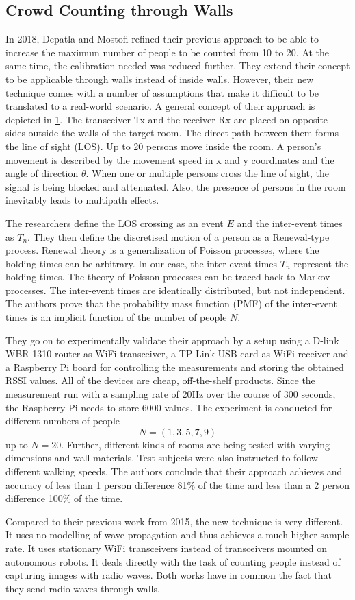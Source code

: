 \documentclass[conference]{IEEEtran}
\begin{document}
\subsection{Crowd Counting through Walls}
In 2018, Depatla and Mostofi \cite{DepatlaMostofi2018} refined their previous approach to be able to increase the maximum number of people to be counted from 10 to 20. At the same time, the calibration needed was reduced further. They extend their concept to be applicable through walls instead of inside walls. However, their new technique comes with a number of assumptions that make it difficult to be translated to a real-world scenario. A general concept of their approach is depicted in \ref{concept}. The transceiver Tx and the receiver Rx are placed on opposite sides outside the walls of the target room. The direct path between them forms the line of sight (LOS). Up to 20 persons move inside the room. A person's movement is described by the movement speed in x and y coordinates and the angle of direction $\theta$. When one or multiple persons cross the line of sight, the signal is being blocked and attenuated. Also, the presence of persons in the room inevitably leads to multipath effects.
\begin{figure}
\label{concept}
\end{figure}
The researchers define the LOS crossing as an event $E$ and the inter-event times as $T_n$. They then define the discretised motion of a person as a Renewal-type process. Renewal theory is a generalization of Poisson processes, where the holding times can be arbitrary. In our case, the inter-event times $T_n$ represent the holding times. The theory of Poisson processes can be traced back to Markov processes. The inter-event times are identically distributed, but not independent. The authors prove that the probability mass function (PMF) of the inter-event times is an implicit function of the number of people $N$.
\par
They go on to experimentally validate their approach by a setup using a D-link WBR-1310 router as WiFi transceiver, a TP-Link USB card as WiFi receiver and a Raspberry Pi board for controlling the measurements and storing the obtained RSSI values. All of the devices are cheap, off-the-shelf products. Since the measurement run with a sampling rate of 20Hz over the course of 300 seconds, the Raspberry Pi needs to store 6000 values. The experiment is conducted for different numbers of people $$N = (1, 3, 5, 7, 9)$$ up to $N=20$. Further, different kinds of rooms are being tested with varying dimensions and wall materials. Test subjects were also instructed to follow different walking speeds. The authors conclude that their approach achieves and accuracy of less than 1 person difference 81\% of the time and less than a 2 person difference 100\% of the time.
\par
Compared to their previous work from 2015, the new technique is very different. It uses no modelling of wave propagation and thus achieves a much higher sample rate. It uses stationary WiFi transceivers instead of transceivers mounted on autonomous robots. It deals directly with the task of counting people instead of capturing images with radio waves. Both works have in common the fact that they send radio waves through walls.
\end{document}
